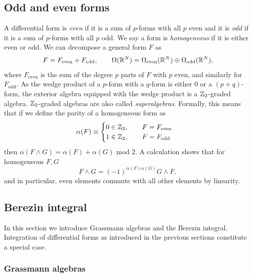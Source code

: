 \documentclass[11pt,a4paper]{article}
\begin{document}
\subsection{Odd and even forms}
A differential form is \emph{even} if it is a sum of $p$-forms with
all $p$ even and it is \emph{odd} if it is a sum of $p$-forms with all
$p$ odd. We say a form is \emph{homogeneous} if it is either even or
odd. We can decompose a general form $F$ as
\begin{equation}
  F = F_{\mathrm{even}} + F_{\mathrm{odd}},
  \qquad 
  \Omega(\mathbb{R}^N) = \Omega_{\mathrm{even}}(\mathbb{R}^N) \oplus \Omega_{\mathrm{odd}}(\mathbb{R}^N),
\end{equation}
where $F_{\mathrm{even}}$ is the sum of the degree
$p$ parts of $F$ with $p$ even, and similarly for $F_{\mathrm{odd}}$.
As the wedge product of a $p$-form with a $q$-form is either $0$
or a $(p+q)$-form, the exterior algebra
equipped with the wedge product is a $\mathbb{Z}_{2}$-graded algebra.
$\mathbb{Z}_{2}$-graded algebras are also called \emph{superalgebras}.
Formally, this means that if we define the parity of a homogeneous form as
\begin{equation}
  \alpha(F) \equiv \begin{cases} 0 \in \mathbb{Z}_2, \qquad F = F_{\mathrm{even}}\\
    1 \in \mathbb{Z}_2,\qquad F = F_{\mathrm{odd}}
  \end{cases}
\end{equation}
then $\alpha(F\wedge G) = \alpha(F) + \alpha(G)$ mod 2. 
A calculation shows that for homogeneous $F,G$
\begin{equation}
  F\wedge G = (-1)^{\alpha(F)\alpha(G)}G\wedge F,
\end{equation}
and in particular, even elements commute
with all other elements by linearity.

\subsection{Berezin integral}
\label{sec:BerezinInt}

In this section we introduce Grassmann algebras and the Berezin
integral. Integration of differential forms as introduced in the
previous sections constitute a special case.

\subsubsection{Grassmann algebras}
\label{sec:grassmann-algebras}
\end{document}
